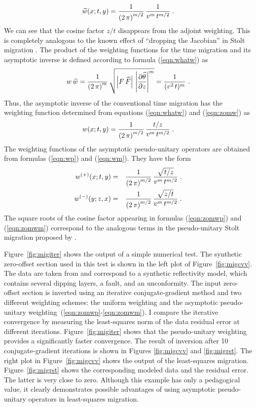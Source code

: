 \begin{equation}
\widetilde{w}(x;t,y) = {1\over{\left(2\,\pi\right)^{m/2}}} \,
{1 \over {v^m\,t^{m/2}}}\;.
\label{eqn:adjzomw}
\end{equation}
We can see that the cosine factor $z/t$ disappears from the adjoint
weighting. This is completely analogous to the known effect of
``dropping the Jacobian'' in Stolt migration
\cite[]{Harlan.sep.35.181,Levin.sep.80.513}.  The product of the
weighting functions for the time migration and its asymptotic inverse
is defined according to formula (\ref{eqn:whatw}) as
\begin{equation}
w\,\widehat{w}={1\over{\left(2\,\pi\right)^m}} \, 
{\sqrt{\left|F\,\widehat{F}\right|\,
\left|\partial \widehat{\theta} \over \partial z\right|^m}} =
{1 \over {(v^2\,t)^m}}\;.
\label{eqn:zomww}
\end{equation}
Thus, the asymptotic inverse of the conventional time migration has
the weighting function determined from equations (\ref{eqn:whatw}) and
(\ref{eqn:zomw}) as
\begin{equation}
w(x;t,y) = {1\over{\left(2\,\pi\right)^{m/2}}} \, {{t/z} \over
{v^m\,t^{m/2}}}\;.
\label{eqn:invzomw}
\end{equation}
The weighting functions of the asymptotic pseudo-unitary operators are
obtained from formulas (\ref{eqn:wp}) and (\ref{eqn:wm}). They have the form
 \begin{eqnarray} 
w^{(+)}(x;t,y) & = &
{1\over{\left(2\,\pi\right)^{m/2}}} \, 
{\sqrt{t/z} \over {v^m\,t^{m/2}}}\;.
\label{eqn:zomwp} \\
w^{(-)}(y;z,x) & = & {1\over{\left(2\,\pi\right)^{m/2}}} \, 
{\sqrt{z/t} \over {v^m\,t^{m/2}}}\;.
\label{eqn:zomwm}
\end{eqnarray}
The square roots of the cosine factor appearing in formulas
(\ref{eqn:zomwp}) and (\ref{eqn:zomwm}) correspond to the analogous
terms in the pseudo-unitary Stolt migration proposed by
\cite{Harlan.sep.48.127}.

Figure~\ref{fig:migiter} shows the output of a simple numerical test.
The synthetic zero-offset section used in this test is shown in the
left plot of Figure~\ref{fig:migcvv}. The data are taken from
\cite{Claerbout.bei.95} and correspond to a synthetic reflectivity
model, which contains several dipping layers, a fault, and an
unconformity. The input zero-offset section is inverted using an
iterative conjugate-gradient method and two different weighting
schemes: the uniform weighting and the asymptotic pseudo-unitary
weighting~(\ref{eqn:zomwp}-\ref{eqn:zomwm}). I compare the iterative
convergence by measuring the least-squares norm of the data residual
error at different iterations.  Figure~\ref{fig:migiter} shows that
the pseudo-unitary weighting provides a significantly faster
convergence.  The result of inversion after 10 conjugate-gradient
iterations is shown in Figures \ref{fig:migcvv} and \ref{fig:migrst}.
The right plot in Figure~\ref{fig:migcvv} shows the output of the
least-squares migration. Figure~\ref{fig:migrst} shows the
corresponding modeled data and the residual error. The latter is very
close to zero. Although this example has only a pedagogical value, it
clearly demonstrates possible advantages of using asymptotic
pseudo-unitary operators in least-squares migration.

